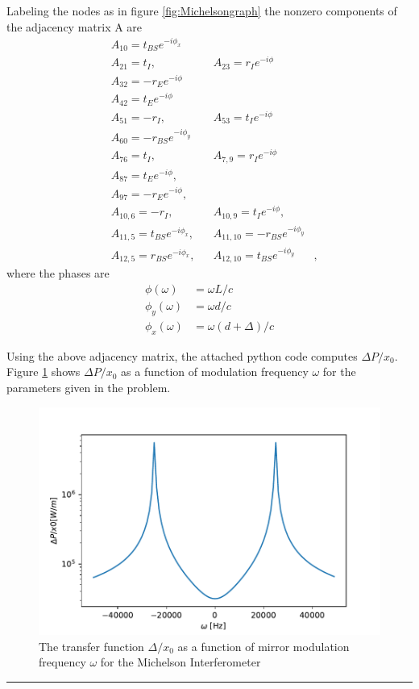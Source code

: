 \documentclass[11pt]{article}
\newcommand{\ep}{e^{-i\phi}}
\begin{document}
\begin{enumerate}
\begin{itemize}
Labeling the nodes as in figure \ref{fig:Michelsongraph} the nonzero components of the adjacency matrix A are 
\begin{align}
&A_{10}=t_{BS}e^{-i\phi_x} & \nonumber \\
&A_{21}=t_I, & &A_{23}=r_Ie^{-i\phi}&  \nonumber \\
&A_{32}=-r_Ee^{-i\phi}& \nonumber  \\
&A_{42}=t_Ee^{-i\phi}& \nonumber \\
&A_{51}=-r_I, & &A_{53}=t_I \ep& \nonumber \\
&A_{60}=-r_{BS}e^{-i\phi_y}& \nonumber \\
&A_{76}=t_I,& &A_{7,9}=r_I\ep& \nonumber \\
&A_{87}=t_E\ep,& \nonumber \\
&A_{97}=-r_E\ep,& \nonumber \\
&A_{10,6}=-r_I,& 
&A_{10,9}=t_I\ep,& \nonumber \\
&A_{11,5}=t_{BS}e^{-i\phi_x},&
&A_{11,10}=-r_{BS}e^{-i\phi_y}& \nonumber \\
&A_{12,5}=r_{BS}e^{-i\phi_x},&
&A_{12,10}=t_{BS}e^{-i\phi_y}&,
\end{align}
where the phases are
\begin{align}
\phi(\omega)&=\omega L/c \nonumber \\ 
\phi_y(\omega)&=\omega d/c \nonumber  \\
\phi_x(\omega) &=\omega(d+\Delta)/c
\end{align}

Using the above adjacency matrix, the attached python code computes $\Delta P/x_0$. Figure \ref{fig:2c} shows  $\Delta P/x_0$ as a function of modulation frequency $\omega$ for the parameters given in the problem.
\begin{figure}[h]
\includegraphics[width =1\columnwidth]{2c}
\caption{The transfer function $\Delta /x_0$ as a function of mirror modulation frequency $\omega$ for the Michelson Interferometer
}
\label{fig:2c}
\end{figure}


\end{itemize}

\end{enumerate}

\bigskip
{\color{Sepia} \hrule}
\end{document}
